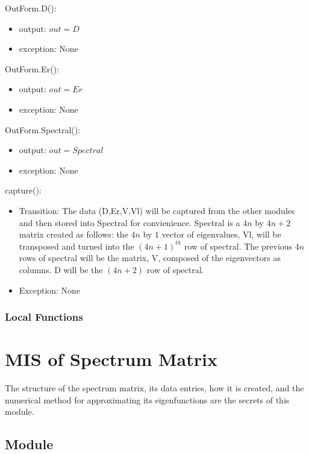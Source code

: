 \documentclass[12pt, titlepage]{article}
\begin{document}
\noindent OutForm.D():
\begin{itemize}
	\item output: $out = D$
	\item exception: None
\end{itemize}

\noindent OutForm.Er():
\begin{itemize}
	\item output: $out = Er$
	\item exception: None
\end{itemize} 

\noindent OutForm.Spectral():
\begin{itemize}
	\item output: $out = Spectral$
	\item exception: None
\end{itemize}

\noindent capture():
\begin{itemize}
	\item Transition: The data (D,Er,V,Vl) will be captured from the other 
	modules and then stored into Spectral for convienience. Spectral is a 
	$4n$ by $4n + 2$ matrix created as follows: the $4n$ by $1$ vector of 
	eigenvalues, Vl, will be transposed and turned into the $(4n+1)^{th}$ row 
	of 
	spectral. The previous $4n$ rows of spectral will be the matrix, V, 
	composed 
	of the eigenvectors as columns. D will be the $(4n+2)$ row of spectral. 
	\item Exception: None
\end{itemize}  

\subsubsection{Local Functions}


\newpage
\section{MIS of Spectrum Matrix} 

The structure of the spectrum matrix, its data entries, how 
it is created, and the numerical method for approximating its 
eigenfunctions are the secrets of this module.  

\subsection{Module}
\end{document}
